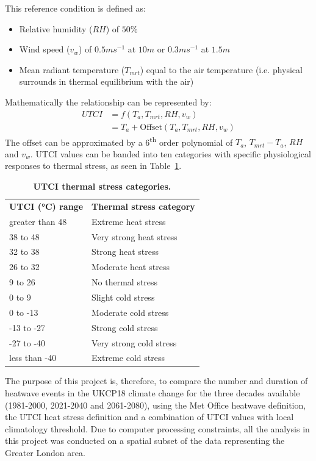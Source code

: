 \documentclass[10pt,letterpaper]{article}
\newlength\savedwidth
\newcommand\thickhline{\noalign{\global\savedwidth\arrayrulewidth\global\arrayrulewidth 2pt}%
\hline
\noalign{\global\arrayrulewidth\savedwidth}}
\begin{document}
\pagebreak
\noindent
This reference condition is defined as:
\begin{itemize}
    \item Relative humidity ($RH$) of $50\%$
    \item Wind speed ($v_w$) of $0.5 ms^{-1}$ at $10 m$ or $0.3 ms^{-1}$ at $1.5 m$
    \item Mean radiant temperature ($T_{mrt}$) equal to the air temperature (i.e. physical surrounds in thermal equilibrium with the air)
\end{itemize}
Mathematically the relationship can be represented by:
\begin{align*}
    UTCI &= f(T_a, T_{mrt}, RH, v_w) \\
    &= T_a + \text{Offset}(T_a, T_{mrt}, RH, v_w)
\end{align*}
The offset can be approximated by a 6\textsuperscript{th} order polynomial of $T_a$, $T_{mrt}-T_a$, $RH$ and $v_w$.\cite{Blazejczyk2013}
UTCI values can be banded into ten categories with specific physiological responses to thermal stress, as seen in Table~\ref{utci-table}.

\begin{table}[]
\centering
\caption{
{\bf UTCI thermal stress categories.\cite{Blazejczyk2013}}}
\begin{tabular}{|l|l|}
\hline
\textbf{UTCI (°C) range} & \textbf{Thermal stress category} \\ \thickhline
greater than 48 & Extreme heat stress     \\ \hline
38 to 48        & Very strong heat stress \\ \hline
32 to 38        & Strong heat stress      \\ \hline
26 to 32        & Moderate heat stress    \\ \hline
9 to 26         & No thermal stress       \\ \hline
0 to 9          & Slight cold stress      \\ \hline
0 to -13        & Moderate cold stress    \\ \hline
-13 to -27      & Strong cold stress      \\ \hline
-27 to -40      & Very strong cold stress \\ \hline
less than -40   & Extreme cold stress     \\ \hline
\end{tabular}
\label{utci-table}
\end{table}


The purpose of this project is, therefore, to compare the number and duration of heatwave events in the UKCP18 climate change for the three decades available (1981-2000, 2021-2040 and 2061-2080), using the Met Office heatwave definition, the UTCI heat stress definition and a combination of UTCI values with local climatology threshold.
Due to computer processing constraints, all the analysis in this project was conducted on a spatial subset of the data representing the Greater London area.
\end{document}
